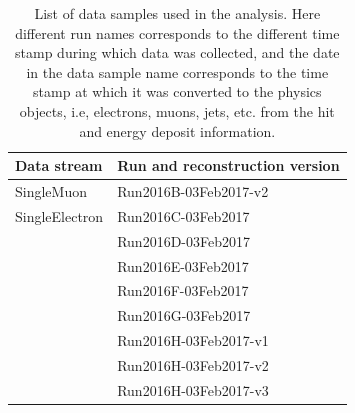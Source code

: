 \begin{table}[!htbp]
  \begin{center}
  \begin{tabular}{l l}
\hline \textbf{Data stream} &  \textbf{Run and reconstruction version}  \\
\hline
SingleMuon      &       Run2016B-03Feb2017-v2       \\
SingleElectron  &       Run2016C-03Feb2017           \\
                &       Run2016D-03Feb2017           \\
		            &       Run2016E-03Feb2017          \\
                &       Run2016F-03Feb2017           \\
		            &       Run2016G-03Feb2017          \\
                &       Run2016H-03Feb2017-v1       \\
		            &       Run2016H-03Feb2017-v2       \\
                &       Run2016H-03Feb2017-v3       \\
\hline
  \end{tabular}
  \caption{List of data samples used in the analysis. Here different run names corresponds to the different time stamp during which data was collected, and the date in the data sample name corresponds to the time stamp at which it was converted to the physics objects, i.e, electrons, muons, jets, etc. from the hit and energy deposit information.}
  \label{tab:datasample}
  \end{center}
\end{table}
 
 
